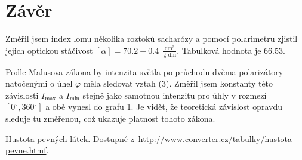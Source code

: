 \documentclass[a4paper,11pt]{article}
\begin{document}
\section{Závěr}

Změřil jsem index lomu několika roztoků sacharózy a pomocí polarimetru zjistil jejich optickou stáčivost $ [\alpha] = 70.2 \pm 0.4 \ \ \frac{\text{cm}^{3}}{\text{g dm}} $. Tabulková hodnota je $ 66.53 $.

Podle Malusova zákona by intenzita světla po průchodu dvěma polarizátory natočenými o úhel $ \varphi $ měla sledovat vztah (3). Změřil jsem konstanty této závislosti $ I_{\text{max}} $ a $ I_{\text{min}} $ stejně jako samotnou intenzitu pro úhly v rozmezí $ [0^{\circ}, 360^{\circ}] $ a obě vynesl do grafu 1. Je vidět, že teoretická závislost opravdu sleduje tu změřenou, což ukazuje platnost tohoto zákona.

\begin{thebibliography}{0}
 Hustota pevných látek. Dostupné z~\url{http://www.converter.cz/tabulky/hustota-pevne.htmf}.   
\end{thebibliography}
\end{document}
